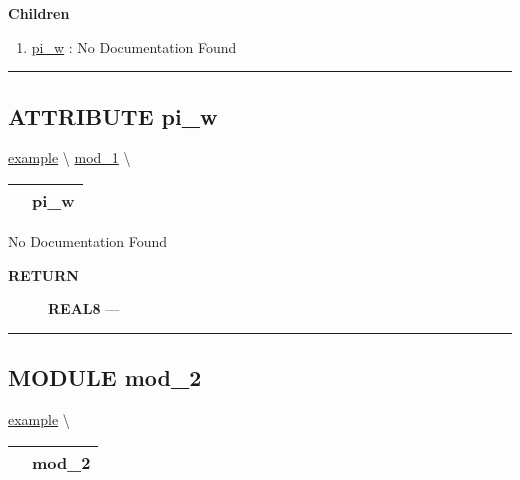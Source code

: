 \textbf{Children}
\begin{enumerate}
\item \hyperlink{ecldoc:example.mod_1.pi_w}{pi\_w}
: No Documentation Found
\end{enumerate}

\rule{\linewidth}{0.5pt}

\subsection*{\textsf{\colorbox{headtoc}{\color{white} ATTRIBUTE}
pi\_w}}

\hypertarget{ecldoc:example.mod_1.pi_w}{}
\hspace{0pt} \hyperlink{ecldoc:example}{example} \textbackslash 
\hspace{0pt} \hyperlink{ecldoc:example.mod_1}{mod_1} \textbackslash 

{\renewcommand{\arraystretch}{1.5}
\begin{tabularx}{\textwidth}{|>{\raggedright\arraybackslash}l|X|}
\hline
\hspace{0pt}\mytexttt{\color{red} } & \textbf{pi\_w} \\
\hline
\end{tabularx}
}

\par





No Documentation Found








\par
\begin{description}
\item [\colorbox{tagtype}{\color{white} \textbf{\textsf{RETURN}}}] \textbf{REAL8} --- 
\end{description}




\rule{\linewidth}{0.5pt}


\subsection*{\textsf{\colorbox{headtoc}{\color{white} MODULE}
mod\_2}}

\hypertarget{ecldoc:example.mod_2}{}
\hspace{0pt} \hyperlink{ecldoc:example}{example} \textbackslash 

{\renewcommand{\arraystretch}{1.5}
\begin{tabularx}{\textwidth}{|>{\raggedright\arraybackslash}l|X|}
\hline
\hspace{0pt}\mytexttt{\color{red} } & \textbf{mod\_2} \\
\hline
\end{tabularx}
}


